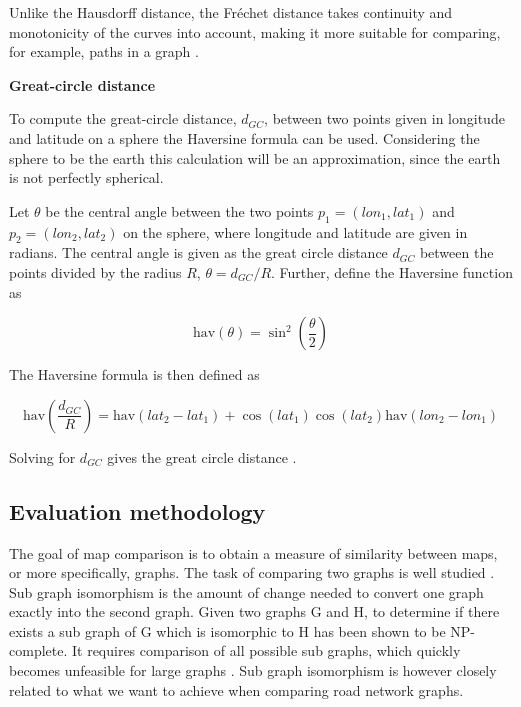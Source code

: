 Unlike the Hausdorff distance, the Fréchet distance takes continuity and monotonicity of the curves into account, making it more suitable for comparing, for example, paths in a graph \citep{pathbased}.


\textbf{Great-circle distance}

To compute the great-circle distance, $d_{GC}$, between two points given in longitude and latitude on a sphere the Haversine formula can be used. Considering the sphere to be the earth this calculation will be an approximation, since the earth is not perfectly spherical. 

Let $\theta$ be the central angle between the two points $p_1 = (lon_1, lat_1)$ and $p_2 = (lon_2, lat_2)$ on the sphere, where longitude and latitude are given in radians. The central angle is given as the great circle distance $d_{GC}$ between the points divided by the radius $R$, $\theta = d_{GC} / R$. Further, define the Haversine function as

\begin{equation}
    \text{hav}(\theta) = \sin^2 \left( \frac{\theta}{2} \right)
\end{equation}

The Haversine formula is then defined as

\begin{equation}
    \text{hav}\left( \frac{d_{GC}}{R} \right) = \text{hav}\left(lat_2 - lat_1\right) + \cos\left(lat_1\right) \cos\left(lat_2\right) \text{hav}\left(lon_2 - lon_1\right)
\end{equation}

Solving for $d_{GC}$ gives the great circle distance \citep{haversine}.

\subsection{Evaluation methodology}
\label{chp:theory.sec:evaluation.sec:meth}

The goal of map comparison is to obtain a measure of similarity between maps, or more specifically, graphs. The task of comparing two graphs is well studied \citep{graphlet_kernels} \citep{subgraphmatching} \citep{shortestpath}. Sub graph isomorphism is the amount of change needed to convert one graph exactly into the second graph. Given two graphs G and H, to determine if there exists a sub graph of G which is isomorphic to H has been shown to be NP-complete. It requires comparison of all possible sub graphs, which quickly becomes unfeasible for large graphs \citep{graphlet_kernels}. Sub graph isomorphism is however closely related to what we want to achieve when comparing road network graphs.

